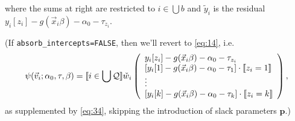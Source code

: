 \documentclass{article}
\DeclarePairedDelimiter{\indicator}{\llbracket}{\rrbracket}
\newcommand{\owt}[1][{[z_{i}]}]{\ensuremath{\check{w}_{i#1}}}
\begin{document}
where the sums at right are restricted to $i \in \bigcup b$ and $\tilde{y}_{i}$ is the residual
$y_{i}[z_{i}] - g(\vec{x}_{i}\beta)-{\alpha}_{0}-\tau_{z_{i}}$.

(If \texttt{absorb\_intercepts=FALSE}, then we'll revert to \eqref{eq:14}, i.e.
\begin{equation*}
         \psi(\vec{v}_{i};
  \alpha_{0}, \tau, \beta) = \indicator{i \in \bigcup \mathcal{Q}}\owt[]
         \left( \begin{array}{l}
           y_{i}[z_{i}] - g(\vec{x}_{i}\beta)-
                  \alpha_0 - \tau_{z_{i}}\\
           {}[y_{i}[1] - g(\vec{x}_{i}\beta)-
                  \alpha_0-\tau_{1}]\cdot \indicator{z_{i}=1}\\
                  \vdots \\
           {}[y_{i}[k] - g(\vec{x}_{i}\beta)-
                 \alpha_0 - \tau_{k}]\cdot \indicator{z_{i}=k}\\%
                \end{array}\right),
\end{equation*}
as supplemented by \eqref{eq:34}, skipping the introduction of slack parameters $\mathbf{p}$.)
\end{document}
